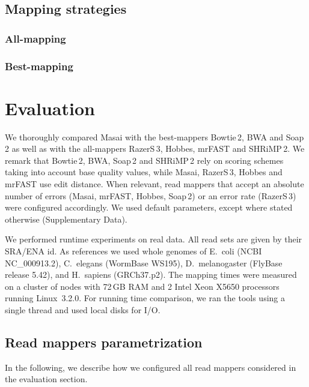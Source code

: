 \subsection{Mapping strategies}
\subsubsection{All-mapping}
\subsubsection{Best-mapping}


\section{Evaluation}

We thoroughly compared Masai with the best-mappers Bowtie\,2, BWA and Soap\,2 as well as with the all-mappers RazerS\,3, Hobbes, mrFAST and SHRiMP\,2.
We remark that Bowtie\,2, BWA, Soap\,2 and SHRiMP\,2 rely on scoring schemes taking into account base quality values, while Masai, RazerS\,3, Hobbes and mrFAST use edit distance.
When relevant, read mappers that accept an absolute number of errors (Masai, mrFAST, Hobbes, Soap\,2) or an error rate (RazerS\,3) were configured accordingly.
We used default parameters, except where stated otherwise (Supplementary Data).

We performed runtime experiments on real data.
All read sets are given by their SRA/ENA id.
As references we used whole genomes of E.~coli (NCBI NC\_000913.2), C.~elegans (WormBase WS195), D.~melanogaster (FlyBase release 5.42), and H.~sapiens (GRCh37.p2).
The mapping times were measured on a cluster of nodes with 72\,GB RAM and 2 Intel Xeon X5650 processors running Linux~3.2.0.
For running time comparison, we ran the tools using a single thread and used local disks for I/O.

\subsection{Read mappers parametrization}

In the following, we describe how we configured all read mappers considered in the evaluation section.

